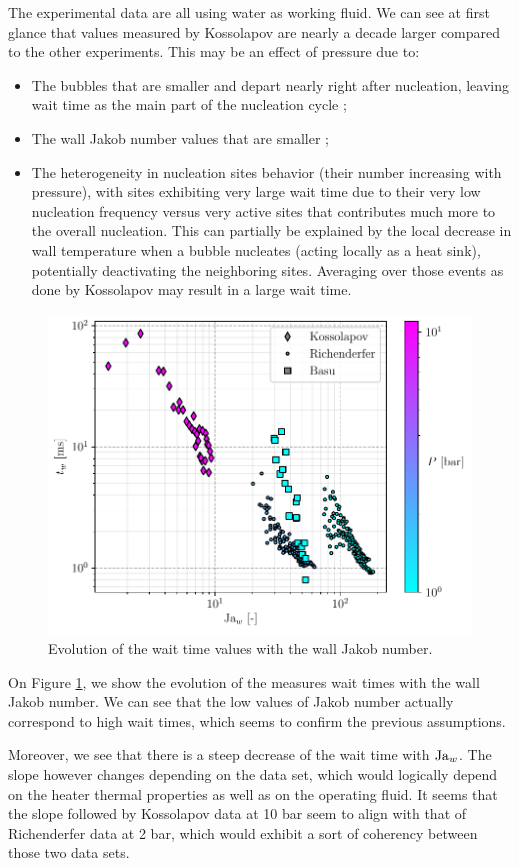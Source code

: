 The experimental data are all using water as working fluid. We can see at first glance that values measured by Kossolapov are nearly a decade larger compared to the other experiments. This may be an effect of pressure due to:

\begin{itemize}
\item The bubbles that are smaller and depart nearly right after nucleation, leaving wait time as the main part of the nucleation cycle ;
\item The wall Jakob number values that are smaller ;
\item The heterogeneity in nucleation sites behavior (their number increasing with pressure), with sites exhibiting very large wait time due to their very low nucleation frequency versus very active sites that contributes much more to the overall nucleation. This can partially be explained by the local decrease in wall temperature when a bubble nucleates (acting locally as a heat sink), potentially deactivating the neighboring sites. Averaging over those events as done by Kossolapov \cite{kossolapov_experimental_2021} may result in a large wait time.
\end{itemize}


\begin{figure}[!h]
\centering
\includegraphics[width=0.6\linewidth]{img/tw/Jaw_tw.pdf}
\caption{Evolution of the wait time values with the wall Jakob number.}
\label{fig:tw_Jaw}
\end{figure}

On Figure \ref{fig:tw_Jaw}, we show the evolution of the measures wait times with the wall Jakob number. We can see that the low values of Jakob number actually correspond to high wait times, which seems to confirm the previous assumptions.

\npar

Moreover, we see that there is a steep decrease of the wait time with $\mathrm{Ja}_{w}$. The slope however changes depending on the data set, which would logically depend on the heater thermal properties as well as on the operating fluid. It seems that the slope followed by Kossolapov data at 10 bar seem to align with that of Richenderfer data at 2 bar, which would exhibit a sort of coherency between those two data sets.

